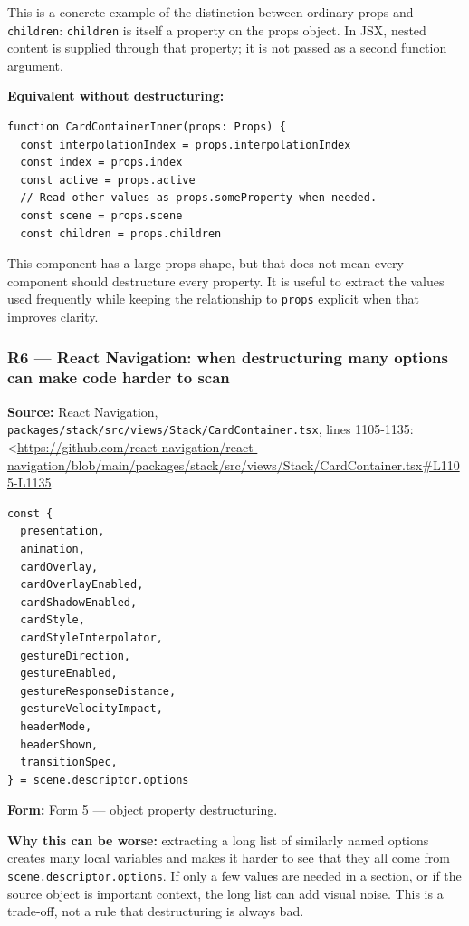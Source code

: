 \documentclass[
]{article}
\newcommand{\passthrough}[1]{#1}
\begin{document}
This is a concrete example of the distinction between ordinary props and
\passthrough{\lstinline!children!}: \passthrough{\lstinline!children!}
is itself a property on the props object. In JSX, nested content is
supplied through that property; it is not passed as a second function
argument.

\textbf{Equivalent without destructuring:}

\begin{lstlisting}
function CardContainerInner(props: Props) {
  const interpolationIndex = props.interpolationIndex
  const index = props.index
  const active = props.active
  // Read other values as props.someProperty when needed.
  const scene = props.scene
  const children = props.children
\end{lstlisting}

This component has a large props shape, but that does not mean every
component should destructure every property. It is useful to extract the
values used frequently while keeping the relationship to
\passthrough{\lstinline!props!} explicit when that improves clarity.

\subsubsection{R6 --- React Navigation: when destructuring many options
can make code harder to
scan}\label{r6--react-navigation-when-destructuring-many-options-can-make-code-harder-to-scan}

\textbf{Source:} React Navigation,
\passthrough{\lstinline!packages/stack/src/views/Stack/CardContainer.tsx!},
lines 1105-1135:
\textless{}\url{https://github.com/react-navigation/react-navigation/blob/main/packages/stack/src/views/Stack/CardContainer.tsx\#L1105-L1135}.

\begin{lstlisting}
const {
  presentation,
  animation,
  cardOverlay,
  cardOverlayEnabled,
  cardShadowEnabled,
  cardStyle,
  cardStyleInterpolator,
  gestureDirection,
  gestureEnabled,
  gestureResponseDistance,
  gestureVelocityImpact,
  headerMode,
  headerShown,
  transitionSpec,
} = scene.descriptor.options
\end{lstlisting}

\textbf{Form:} Form 5 --- object property destructuring.

\textbf{Why this can be worse:} extracting a long list of similarly
named options creates many local variables and makes it harder to see
that they all come from
\passthrough{\lstinline!scene.descriptor.options!}. If only a few values
are needed in a section, or if the source object is important context,
the long list can add visual noise. This is a trade-off, not a rule that
destructuring is always bad.
\end{document}
